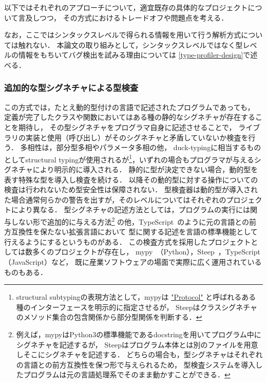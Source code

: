 以下ではそれぞれのアプローチについて，適宜既存の具体的なプロジェクトについて言及しつつ，
その方式におけるトレードオフや問題点を考える．

なお，ここではシンタックスレベルで得られる情報を用いて行う解析方式については触れない．
本論文の取り組みとして，シンタックスレベルではなく型レベルの情報をもちいてバグ検出を試みる理由については
\ref{type-profiler-design}で述べる．

\subsubsection{追加的な型シグネチャによる型検査}

この方式では，たとえ動的型付けの言語で記述されたプログラムであっても，
定義が完了したクラスや関数においてはある種の静的なシグネチャが存在することを期待し，
その型シグネチャをプログラマ自身に記述させることで，
ライブラリの実装と使用（呼び出し）がそのシグネチャと矛盾していないか検査を行う\cite{ruby-progress-report}．
多相性は，部分型多相やパラメータ多相の他，
duck-typingに相当するものとしてstructural typingが使用されるが\footnote{
  structural subtypingの表現方法として，mypyは
  \href{https://mypy.readthedocs.io/en/latest/protocols.html\#protocols-and-structural-subtyping}{"Protocol"}
  と呼ばれるある種のインターフェースを明示的に指定させるが，
  Steepはクラスシグネチャのメソッド集合の包含関係から部分型関係を判断する．%
}，いずれの場合もプログラマが与えるシグネチャにより明示的に導入される．
静的に型が決定できない場合，動的型を表す特殊な型を導入し検査を続ける．
以降その動的型に対する操作についての検査は行われないため型安全性は保障されない．
型検査器は動的型が導入された場合通常何らかの警告を出すが，そのレベルについてはそれぞれのプロジェクトにより異なる．
型シグネチャの記述方法としては，プログラムの実行には関与しない形で追加的に与える方法\footnote{
  例えば，mypyはPython3の標準機能であるdocstringを用いてプログラム中にシグネチャを記述するが，
  Steepはプログラム本体とは別のファイルを用意しそこにシグネチャを記述する．
  どちらの場合も，型シグネチャはそれぞれの言語との前方互換性を保つ形で与えられるため，
  型検査システムを導入したプログラムは元の言語処理系でそのまま動かすことができる．
}
の他，TypeScript~\cite{typescript}のように元の言語との前方互換性を保たない拡張言語において
型に関する記述を言語の標準機能として行えるようにするというものがある．
この検査方式を採用したプロジェクトとしては数多くのプロジェクトが存在し，
mypy~\cite{mypy}（Python），Steep~\cite{steep}，TypeScript（JavaScript）など，
既に産業ソフトウェアの場面で実際に広く運用されているものもある．

